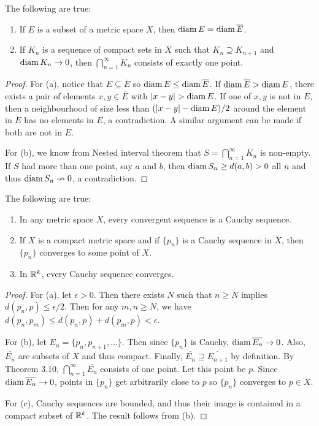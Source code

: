 \begin{theorem} %
The following are true:
\begin{enumerate}
\item If $E$ is a subset of a metric space $X$, then $\operatorname{diam} E = \operatorname{diam} \overline{E}$. 

\item If $K_n$ is a sequence of compact sets in $X$ such that $K_n \supseteq K_{n+1}$ and $\operatorname{diam} K_n \rightarrow 0$, then $\bigcap_{n=1}^{\infty} K_n$ consists of exactly one point.
\end{enumerate}

\begin{proof}
For (a), notice that $E \subseteq \overline{E}$ so $\operatorname{diam} E \le \operatorname{diam} \overline{E}$. If $\operatorname{diam} \overline{E} > \operatorname{diam} E$, there exists a pair of elements $x, y \in \overline{E}$ with $|x - y| > \operatorname{diam} E$. If one of $x, y$ is not in $E$, then a neighbourhood of size less than $(|x - y| - \operatorname{diam} E)/2$ around the element in $\overline{E}$ has no elements in $E$, a contradiction. A similar argument can be made if both are not in $E$. 

For (b), we know from Nested interval theorem that $S = \bigcap_{n=1}^{\infty} K_n$ is non-empty. If $S$ had more than one point, say $a$ and $b$, then $\operatorname{diam} S_n \ge d(a, b) > 0$ all $n$ and thus $\operatorname{diam} S_n \nrightarrow 0$, a contradiction.
\end{proof}
\end{theorem}

\begin{theorem} %
The following are true:
\begin{enumerate}
\item In any metric space $X$, every convergent sequence is a Cauchy sequence.

\item If $X$ is a compact metric space and if $\{p_n\}$ is a Cauchy sequence in $X$, then $\{p_n\}$ converges to some point of $X$.

\item In $\mathbb{R}^k$, every Cauchy sequence converges.
\end{enumerate}

\begin{proof}
For (a), let $\epsilon > 0$. Then there exists $N$ such that $n \ge N$ implies $d(p_n, p) \le \epsilon/2$. Then for any $m, n \ge N$, we have $d(p_n, p_m) \le d(p_n, p) + d(p_m, p) < \epsilon$. 

For (b), let $E_n = \{p_n, p_{n+1}, \dotsc\}$. Then since $\{p_n\}$ is Cauchy, $\operatorname{diam} \overline{E_n} \rightarrow 0$. Also, $\overline{E_n}$ are subsets of $X$ and thus compact. Finally, $\overline{E_n} \supseteq \overline{E_{n+1}}$ by definition. By Theorem 3.10, $\bigcap_{n=1}^{\infty} \overline{E_n}$ consists of one point. Let this point be $p$. Since $\operatorname{diam} \overline{E_n} \rightarrow 0$, points in $\{p_n\}$ get arbitrarily close to $p$ so $\{p_n\}$ converges to $p \in X$.

For (c), Cauchy sequences are bounded, and thus their image is contained in a compact subset of $\mathbb{R}^k$. The result follows from (b).
\end{proof}
\end{theorem}

